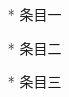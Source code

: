 \message{ !name(main.tex)}\documentclass[a4paper]{article}
\begin{document}
            \begin{enumerate}
                \item[*] 条目一
                \item[*] 条目二
                \item[*] 条目三
            \end{enumerate}
\end{document}
